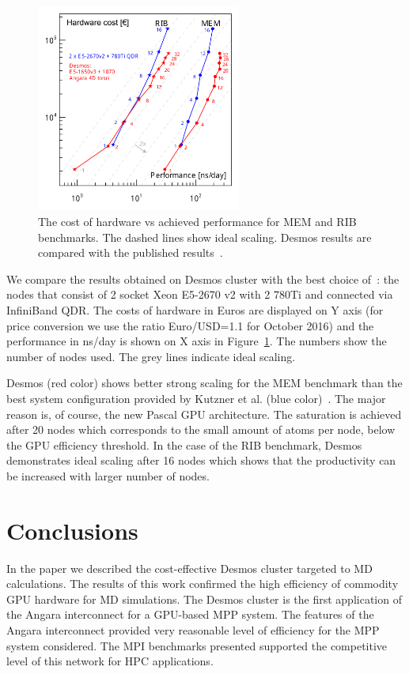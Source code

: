 \documentclass{llncs}
\begin{document}
\begin{figure}
\centering
\includegraphics[width=0.6\textwidth]{img/best_bang.pdf}
\caption{\label{BestBang} The cost of hardware vs achieved performance for MEM and RIB benchmarks. The dashed lines show ideal scaling. Desmos results are compared with the published results~\cite{Kutzner2015}.}
\end{figure}

We compare the results obtained on Desmos cluster with the best choice of~\cite{Kutzner2015}: the nodes that consist of 2 socket Xeon E5-2670 v2 with 2 780Ti and connected via InfiniBand QDR. The costs of hardware in Euros are displayed on Y axis (for price conversion we use the ratio Euro/USD=1.1 for October 2016) and the performance in ns/day is shown on X axis in Figure~\ref{BestBang}. The numbers show the number of nodes used. The grey lines indicate ideal scaling.

Desmos (red color) shows better strong scaling for the MEM benchmark than the best system configuration provided by Kutzner et al. (blue color)~\cite{Kutzner2015}. The major reason is, of course, the new Pascal GPU architecture. The saturation is achieved after 20 nodes which corresponds to the small amount of atoms per node, below the GPU efficiency threshold. In the case of the RIB benchmark, Desmos demonstrates ideal scaling after 16 nodes which shows that the productivity can be increased with larger number of nodes.


\section{Conclusions}

In the paper we described the cost-effective Desmos cluster targeted to MD calculations. The results of this work confirmed the high efficiency of commodity GPU hardware for MD simulations. The Desmos cluster is the first application of the Angara interconnect for a GPU-based MPP system. The features of the Angara interconnect provided very reasonable level of efficiency for the MPP system considered. The MPI benchmarks presented supported the competitive level of this network for HPC applications.
\end{document}
